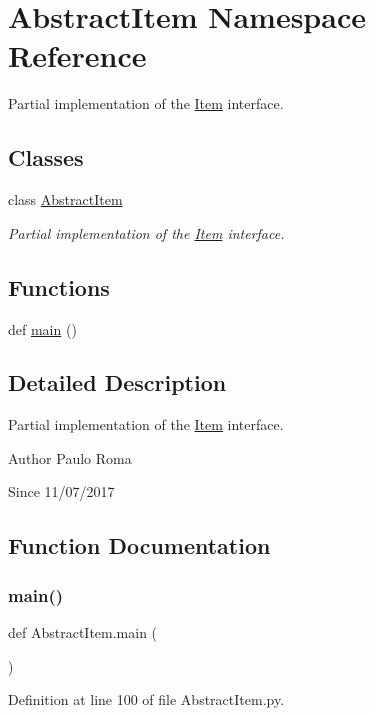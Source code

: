 \hypertarget{namespaceAbstractItem}{}\section{Abstract\+Item Namespace Reference}
\label{namespaceAbstractItem}


Partial implementation of the \hyperlink{namespaceItem}{Item} interface.  


\subsection*{Classes}
\begin{DoxyCompactItemize}
\item 
class \hyperlink{classAbstractItem_1_1AbstractItem}{Abstract\+Item}
\begin{DoxyCompactList}\small\item\em Partial implementation of the \hyperlink{namespaceItem}{Item} interface. \end{DoxyCompactList}\end{DoxyCompactItemize}
\subsection*{Functions}
\begin{DoxyCompactItemize}
\item 
def \hyperlink{namespaceAbstractItem_a7d683b601738c49aaaca4fd256281fa4}{main} ()
\end{DoxyCompactItemize}


\subsection{Detailed Description}
Partial implementation of the \hyperlink{namespaceItem}{Item} interface. 

\begin{DoxyAuthor}{Author}
Paulo Roma 
\end{DoxyAuthor}
\begin{DoxySince}{Since}
11/07/2017 
\end{DoxySince}


\subsection{Function Documentation}
\mbox{\label{namespaceAbstractItem_a7d683b601738c49aaaca4fd256281fa4}} 
\subsubsection{\texorpdfstring{main()}{main()}}
{\footnotesize\ttfamily def Abstract\+Item.\+main (\begin{DoxyParamCaption}{ }\end{DoxyParamCaption})}



Definition at line 100 of file Abstract\+Item.\+py.

